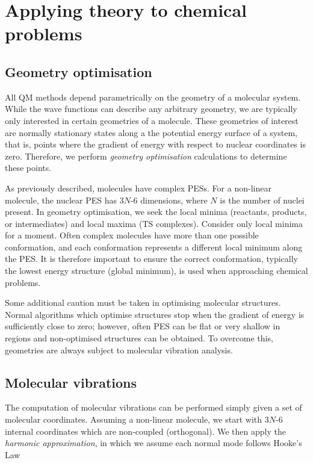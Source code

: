 \section{Applying theory to chemical problems}

\subsection{Geometry optimisation}


All QM methods depend parametrically on the geometry of a molecular system. While the wave functions can describe any arbitrary geometry, we are typically only interested in certain geometries of a molecule. These geometries of interest are normally stationary states along a the potential energy surface of a system, that is, points where the gradient of energy with respect to nuclear coordinates is zero. Therefore, we perform \emph{geometry optimisation} calculations to determine these points.

As previously described, molecules have complex PESs. For a non-linear molecule, the nuclear PES has 3$N$-6 dimensions, where $N$ is the number of nuclei present.\cite{Heidrich1991} In geometry optimisation, we seek the local minima (reactants, products, or intermediates) and local maxima (TS complexes). Consider only local minima for a moment. Often complex molecules have more than one possible conformation, and each conformation represents a different local minimum along the PES. It is therefore important to ensure the correct conformation, typically the lowest energy structure (global minimum), is used when approaching chemical problems.

Some additional caution must be taken in optimising molecular structures. Normal algorithms which optimise structures stop when the gradient of energy is sufficiently close to zero; however, often PES can be flat or very shallow in regions and non-optimised structures can be obtained. To overcome this, geometries are always subject to molecular vibration analysis.

\subsection{Molecular vibrations}

The computation of molecular vibrations can be performed simply given a set of molecular coordinates.\cite{Wilson1980} Assuming a non-linear molecule, we start with 3$N$-6 internal coordinates which are non-coupled (orthogonal). We then apply the \emph{harmonic approximation}, in which we assume each normal mode follows Hooke's Law

